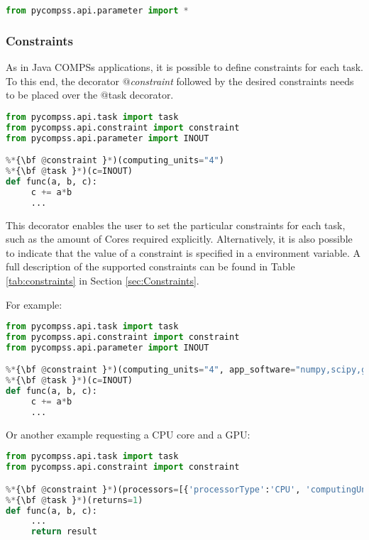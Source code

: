 \begin{lstlisting}[language=python]
from pycompss.api.parameter import *
\end{lstlisting}

\subsubsection{Constraints}
\label{subsubsec:constraints}

As in Java COMPSs applications, it is possible to define constraints for each task.
To this end, the decorator {\it $@$constraint} followed by the desired constraints needs to be placed over the $@$task decorator.

\begin{lstlisting}[language=python]
from pycompss.api.task import task
from pycompss.api.constraint import constraint
from pycompss.api.parameter import INOUT

%*{\bf @constraint }*)(computing_units="4")
%*{\bf @task }*)(c=INOUT)
def func(a, b, c):
     c += a*b
     ...
\end{lstlisting}

This decorator enables the user to set the particular constraints for each task, such as the amount of Cores required explicitly.
Alternatively, it is also possible to indicate that the value of a constraint is specified in a environment variable.
A full description of the supported constraints can be found in Table \ref{tab:constraints} in Section \ref{sec:Constraints}.

For example:

\begin{lstlisting}[language=python]
from pycompss.api.task import task
from pycompss.api.constraint import constraint
from pycompss.api.parameter import INOUT

%*{\bf @constraint }*)(computing_units="4", app_software="numpy,scipy,gnuplot", memory_size="$MIN_MEM_REQ")
%*{\bf @task }*)(c=INOUT)
def func(a, b, c):
     c += a*b
     ...
\end{lstlisting}

Or another example requesting a CPU core and a GPU:

\begin{lstlisting}[language=python]
from pycompss.api.task import task
from pycompss.api.constraint import constraint

%*{\bf @constraint }*)(processors=[{'processorType':'CPU', 'computingUnits':'1'}, {'processorType':'GPU', 'computingUnits':'1'}])
%*{\bf @task }*)(returns=1)
def func(a, b, c):
     ...
     return result
\end{lstlisting}

